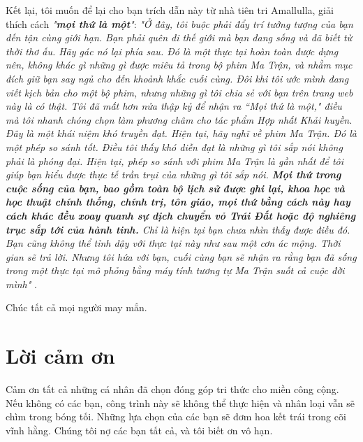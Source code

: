 Kết lại, tôi muốn để lại cho bạn trích dẫn này từ nhà tiên tri Amallulla, giải thích cách \textit{"\textbf{mọi thứ là một}"}: \textit{"Ở đây, tôi buộc phải đẩy trí tưởng tượng của bạn đến tận cùng giới hạn. Bạn phải quên đi thế giới mà bạn đang sống và đã biết từ thời thơ ấu. Hãy gác nó lại phía sau. Đó là một thực tại hoàn toàn được dựng nên, không khác gì những gì được miêu tả trong bộ phim Ma Trận, và nhằm mục đích giữ bạn say ngủ cho đến khoảnh khắc cuối cùng. Đôi khi tôi ước mình đang viết kịch bản cho một bộ phim, nhưng những gì tôi chia sẻ với bạn trên trang web này là có thật. Tôi đã mất hơn nửa thập kỷ để nhận ra “Mọi thứ là một," điều mà tôi nhanh chóng chọn làm phương châm cho tác phẩm Hợp nhất Khải huyền. Đây là một khái niệm khó truyền đạt. Hiện tại, hãy nghĩ về phim Ma Trận. Đó là một phép so sánh tốt. Điều tôi thấy khó diễn đạt là những gì tôi sắp nói không phải là phóng đại. Hiện tại, phép so sánh với phim Ma Trận là gần nhất để tôi giúp bạn hiểu được thực tế trần trụi của những gì tôi sắp nói. \textbf{Mọi thứ trong cuộc sống của bạn, bao gồm toàn bộ lịch sử được ghi lại, khoa học và học thuật chính thống, chính trị, tôn giáo, mọi thứ bằng cách này hay cách khác đều xoay quanh sự dịch chuyển vỏ Trái Đất hoặc độ nghiêng trục sắp tới của hành tinh.} Chỉ là hiện tại bạn chưa nhìn thấy được điều đó. Bạn cũng không thể tỉnh dậy với thực tại này như sau một cơn ác mộng. Thời gian sẽ trả lời. Nhưng tôi hứa với bạn, cuối cùng bạn sẽ nhận ra rằng bạn đã sống trong một thực tại mô phỏng bằng máy tính tương tự Ma Trận suốt cả cuộc đời mình"} \cite{33,34}.

Chúc tất cả mọi người may mắn.

\section{Lời cảm ơn}

Cảm ơn tất cả những cá nhân đã chọn đóng góp tri thức cho miền công cộng. Nếu không có các bạn, công trình này sẽ không thể thực hiện và nhân loại vẫn sẽ chìm trong bóng tối. Những lựa chọn của các bạn sẽ đơm hoa kết trái trong cõi vĩnh hằng. Chúng tôi nợ các bạn tất cả, và tôi biết ơn vô hạn.

\clearpage
\twocolumn

{\small
\renewcommand{\refname}{Tài liệu tham khảo}


}

